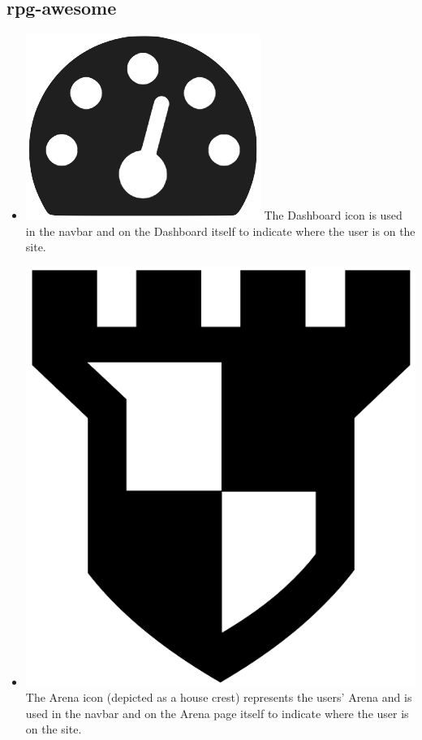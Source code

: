 \documentclass[12pt,a4paper]{report}
\begin{document}
	\subsection{rpg-awesome}
	\begin{itemize}
		\item \includegraphics[scale=.06]{dashboard_icon}
		The Dashboard icon is used in the navbar and on the Dashboard itself to indicate where the user is on the site.
		\item \includegraphics[scale=.03]{arena_icon}
		The Arena icon (depicted as a house crest) represents the users' Arena and is used in the navbar and on the Arena page itself to indicate where the user is on the site.

\end{itemize}
\end{document}
